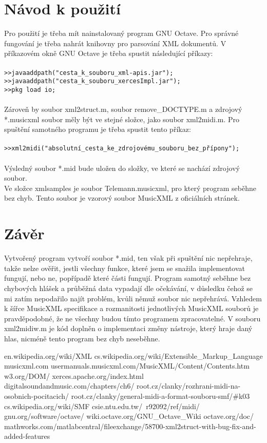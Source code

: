 \documentclass[12pt,a4paper,titlepage]{article}
\begin{document}
\section{Návod k použití}
Pro použití je třeba mít nainstalovaný program GNU Octave\cite{octave}.
Pro správné fungování je třeba nahrát knihovny pro parsování XML dokumentů. 
V příkazovém okně GNU Octave je třeba spustit následující příkazy:\\
\\
\texttt{>>javaaddpath("cesta\_k\_souboru\_xml-apis.jar");\\
>>javaaddpath("cesta\_k\_souboru\_xercesImpl.jar");\\
>>pkg load io;}\\
\\
Zároveň by soubor xml2struct.m, soubor remove\_DOCTYPE.m a zdrojový *.musicxml soubor měly být ve stejné složce, jako soubor xml2midi.m.
Pro spuštění samotného programu je třeba spustit tento příkaz:\\
\\
\texttt{>>xml2midi("absolutní\_cesta\_ke\_zdrojovému\_souboru\_bez\_přípony");}\\
\\
Výsledný soubor *.mid bude uložen do složky, ve které se nachází zdrojový soubor.\\
Ve složce xmlsamples je soubor Telemann.musicxml, pro který program seběhne bez chyb. Tento soubor je vzorový soubor MusicXML z oficiálních stránek\cite{mxml}. 
\section{Závěr}
Vytvořený program vytvoří soubor *.mid, ten však při spuštění nic nepřehraje, takže nelze ověřit, jestli všechny funkce, které jsem se snažila implementovat fungují, nebo ne, popřípadě které části fungují. Program samotný seběhne bez chybových hlášek a průběžná data vypadají dle očekávání, v důsledku čehož se mi zatím nepodařilo najít problém, kvůli němuž soubor nic nepřehrává. Vzhledem k šířce MusicXML specifikace a rozmanitosti jednotlivých MusicXML souborů je pravděpodobné, že ne všechny budou tímto programem zpracovatelné. V souboru xml2midiw.m je kód doplněn o implementaci změny nástroje, který hraje daný hlas, nicméně tento program bez chyb neseběhne.
\newpage
{}
\begin{thebibliography}{20}
en.wikipedia.org/wiki/XML
cs.wikipedia.org/wiki/Extensible\_Markup\_Language
musicxml.com
usermanuals.musicxml.com/MusicXML/Content/Contents.htm
w3.org/DOM/
xerces.apache.org/index.html
digitalsoundandmusic.com/chapters/ch6/
root.cz/clanky/rozhrani-midi-na-osobnich-pocitacich/
root.cz/clanky/general-midi-a-format-souboru-smf/\#k03
cs.wikipedia.org/wiki/SMF
csie.ntu.edu.tw/~r92092/ref/midi/
gnu.org/software/octave/
wiki.octave.org/GNU\_Octave\_Wiki
octave.org/doc/
mathworks.com/matlabcentral/fileexchange/58700-xml2struct-with-bug-fix-and-added-features
\end{thebibliography}
\end{document}
